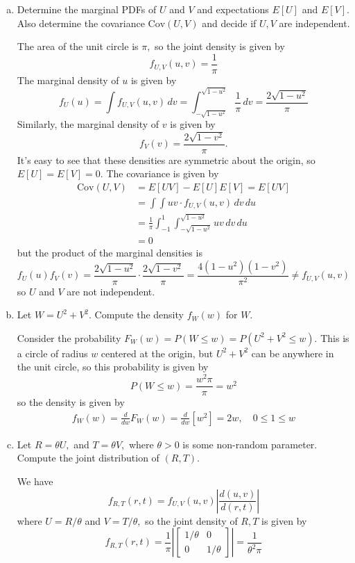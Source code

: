 \documentclass{article}
\newcommand{\cov}{\mathrm{Cov}}
\begin{document}
\begin{enumerate}
		\begin{enumerate}[(a)]
			\item Determine the marginal PDFs of $U$ and $V$ and expectations $E[U]$ and $E[V].$ Also determine the covariance $\cov(U, V)$ and decide if $U, V$ are independent.
				\begin{soln}
					The area of the unit circle is $\pi,$ so the joint density is given by \[f_{U, V}(u, v) = \frac{1}{\pi}\] The marginal density of $u$ is given by \[f_U(u)=\int f_{U, V}(u, v)\, dv = \int_{-\sqrt{1-u^2}}^{\sqrt{1-u^2}} \frac{1}{\pi}\, dv = \frac{2\sqrt{1-u^2}}{\pi}\] Similarly, the marginal density of $v$ is given by \[f_V(v)=\frac{2\sqrt{1-v^2}}{\pi}.\] It's easy to see that these densities are symmetric about the origin, so $E[U]=E[V]=0.$ The covariance is given by 
					\begin{align*}
						\cov(U, V) &= E[UV]-E[U]E[V] = E[UV] \\
						&= \int \int uv\cdot f_{U, V}(u, v)\, dv\, du \\
						&= \frac{1}{\pi}\int_{-1}^1 \int_{-\sqrt{1-u^2}}^{\sqrt{1-u^2}}uv\, dv\, du \\
						&= 0
					\end{align*} but the product of the marginal densities is \[f_U(u)f_V(v)=\frac{2\sqrt{1-u^2}}{\pi}\cdot\frac{2\sqrt{1-v^2}}{\pi}=\frac{4(1-u^2)(1-v^2)}{\pi^2}\neq f_{U, V}(u, v)\] so $U$ and $V$ are not independent.
					
				\end{soln}

			\item Let $W=U^2+V^2.$ Compute the density $f_W(w)$ for $W.$
				\begin{soln}
					Consider the probability $F_W(w)=P(W\le w)=P(U^2+V^2\le w).$ This is a circle of radius $w$ centered at the origin, but $U^2+V^2$ can be anywhere in the unit circle, so this probability is given by \[P(W\le w)=\frac{w^2\pi}{\pi}=w^2\] so the density is given by 
					\begin{align*}
						f_W(w)=\frac{d}{dw}F_W(w) = \frac{d}{dw}\left[ w^2 \right]=2w, \quad0\le 1\le w
					\end{align*}
				\end{soln}

			\item Let $R=\theta U,$ and $T=\theta V,$ where $\theta>0$ is some non-random parameter. Compute the joint distribution of $(R, T).$
				\begin{soln}
					We have \[f_{R, T}(r, t) = f_{U, V}(u, v) \left\lvert \frac{d(u, v)}{d(r, t)} \right\rvert\] where $U=R/\theta$ and $V=T/\theta,$ so the joint density of $R, T$ is given by \[f_{R, T}(r, t) = \frac{1}{\pi}\left\lvert \begin{bmatrix}
							1/\theta & 0 \\ 0 & 1/\theta
					\end{bmatrix}\right\rvert = \frac{1}{\theta^2\pi}\]
				\end{soln}
				

\end{enumerate}
\end{enumerate}
\end{document}
